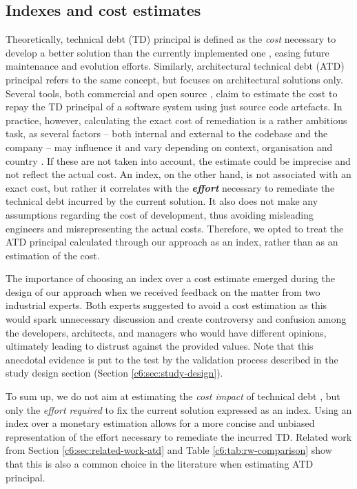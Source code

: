 \subsection{Indexes and cost estimates}
Theoretically, technical debt (TD) principal is defined as the \emph{cost} necessary to develop a better solution than the currently implemented one \cite{Avgeriou2016}, easing future maintenance and evolution efforts.
Similarly, architectural technical debt (ATD) principal refers to the same concept, but focuses on architectural solutions only.
Several tools, both commercial and open source \cite{Avgeriou2021,Khomyakov2020}, claim to estimate the cost to repay the TD principal of a software system using just source code artefacts.
In practice, however, calculating the exact cost of remediation is a rather ambitious task, as several factors -- both internal and external to the codebase and the company -- may influence it and vary depending on context, organisation and country \cite{Murillo2021,Rios2020,Rios2018}.
If these are not taken into account, the estimate could be imprecise and not reflect the actual cost. 
An index, on the other hand, is not associated with an exact cost, but rather it correlates with the \textbf{\emph{effort}} necessary to remediate the technical debt incurred by the current solution.
It also does not make any assumptions regarding the cost of development, thus avoiding misleading engineers and misrepresenting the actual costs.
Therefore, we opted to treat the ATD principal calculated through our approach as an index, rather than as an estimation of the cost. 

The importance of choosing an index over a cost estimate emerged during the design of our approach when we received feedback on the matter from two industrial experts. 
Both experts suggested to avoid a cost estimation as this would spark unnecessary discussion and create controversy and confusion among the developers, architects, and managers who would have different opinions, ultimately leading to distrust against the provided values.
Note that this anecdotal evidence is put to the test by the validation process described in the study design section (Section \ref{c6:sec:study-design}).

To sum up, we do not aim at estimating the \emph{cost impact} of technical debt \cite{Avgeriou2016}, but only the \emph{effort required} to fix the current solution \cite{Avgeriou2016} expressed as an index. 
Using an index over a monetary estimation allows for a more concise and unbiased representation of the effort necessary to remediate the incurred TD. 
Related work from Section \ref{c6:sec:related-work-atd} and Table \ref{c6:tab:rw-comparison} show that this is also a common choice in the literature when estimating ATD principal.

